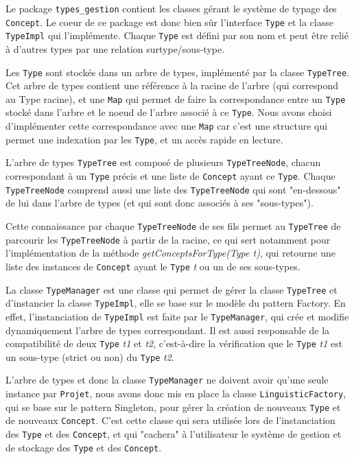\documentclass[12pt]{report}
\begin{document}
Le package \texttt{types\_gestion} contient les classes gérant le système de typage des \texttt{Concept}. Le coeur de ce package est donc bien sûr l'interface \texttt{Type} et la classe \texttt{TypeImpl} qui l'implémente.
Chaque \texttt{Type} est défini par son nom et peut être relié à d'autres types par une relation surtype/sous-type.

\bigskip

Les \texttt{Type} sont stockés dans un arbre de types, implémenté par la classe \texttt{TypeTree}. Cet arbre de types contient une référence à la racine de l'arbre (qui correspond au Type racine), et une \texttt{Map} qui permet de faire la correspondance entre un \texttt{Type} stocké dans l'arbre et le noeud de l'arbre associé à ce \texttt{Type}. Nous avons choisi d'implémenter cette correspondance avec une \texttt{Map} car c'est une structure qui permet une indexation par les \texttt{Type}, et un accès rapide en lecture.

L'arbre de types \texttt{TypeTree} est composé de plusieurs \texttt{TypeTreeNode}, chacun correspondant à un \texttt{Type} précis et une liste de \texttt{Concept} ayant ce \texttt{Type}. Chaque \texttt{TypeTreeNode} comprend aussi une liste des \texttt{TypeTreeNode} qui sont "en-dessous" de lui dans l'arbre de types (et qui sont donc associés à ses "sous-types").

Cette connaissance par chaque \texttt{TypeTreeNode} de ses fils permet au \texttt{TypeTree} de parcourir les \texttt{TypeTreeNode} à partir de la racine, ce qui sert notamment pour l'implémentation de la méthode \emph{getConceptsForType(Type t)}, qui retourne une liste des instances de \texttt{Concept} ayant le \texttt{Type} \emph{t} ou un de ses sous-types.

\bigskip

La classe \texttt{TypeManager} est une classe qui permet de gérer la classe \texttt{TypeTree} et d'instancier la classe \texttt{TypeImpl}, elle se base sur le modèle du pattern Factory. En effet, l'instanciation de \texttt{TypeImpl} est faite par le \texttt{TypeManager}, qui crée et modifie dynamiquement l'arbre de types correspondant. Il est aussi responsable de la compatibilité de deux \texttt{Type} \emph{t1} et \emph{t2}, c'est-à-dire la vérification que le \texttt{Type} \emph{t1} est un sous-type (strict ou non) du \texttt{Type} \emph{t2}.

\bigskip

L'arbre de types et donc la classe \texttt{TypeManager} ne doivent avoir qu'une seule instance par \texttt{Projet}, nous avons donc mis en place la classe \texttt{LinguisticFactory}, qui se base sur le pattern Singleton, pour gérer la création de nouveaux \texttt{Type} et de nouveaux \texttt{Concept}. C'est cette classe qui sera utilisée lors de l'instanciation des \texttt{Type} et des \texttt{Concept}, et qui "cachera" à l'utilisateur le système de gestion et de stockage des \texttt{Type} et des \texttt{Concept}.
\end{document}
